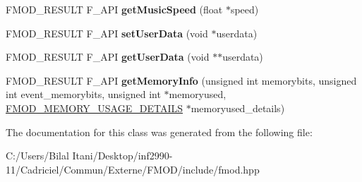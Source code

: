 \begin{DoxyCompactItemize}
\item 
F\+M\+O\+D\+\_\+\+R\+E\+S\+U\+LT F\+\_\+\+A\+PI {\bfseries get\+Music\+Speed} (float $\ast$speed)\hypertarget{class_f_m_o_d_1_1_sound_a22e4865bfd9f4bf40633671439dade82}{}\label{class_f_m_o_d_1_1_sound_a22e4865bfd9f4bf40633671439dade82}

\item 
F\+M\+O\+D\+\_\+\+R\+E\+S\+U\+LT F\+\_\+\+A\+PI {\bfseries set\+User\+Data} (void $\ast$userdata)\hypertarget{class_f_m_o_d_1_1_sound_ac921f8c260ef5b396a837016d5882713}{}\label{class_f_m_o_d_1_1_sound_ac921f8c260ef5b396a837016d5882713}

\item 
F\+M\+O\+D\+\_\+\+R\+E\+S\+U\+LT F\+\_\+\+A\+PI {\bfseries get\+User\+Data} (void $\ast$$\ast$userdata)\hypertarget{class_f_m_o_d_1_1_sound_a829f8e68b254764374c38e6e23f7f8df}{}\label{class_f_m_o_d_1_1_sound_a829f8e68b254764374c38e6e23f7f8df}

\item 
F\+M\+O\+D\+\_\+\+R\+E\+S\+U\+LT F\+\_\+\+A\+PI {\bfseries get\+Memory\+Info} (unsigned int memorybits, unsigned int event\+\_\+memorybits, unsigned int $\ast$memoryused, \hyperlink{struct_f_m_o_d___m_e_m_o_r_y___u_s_a_g_e___d_e_t_a_i_l_s}{F\+M\+O\+D\+\_\+\+M\+E\+M\+O\+R\+Y\+\_\+\+U\+S\+A\+G\+E\+\_\+\+D\+E\+T\+A\+I\+LS} $\ast$memoryused\+\_\+details)\hypertarget{class_f_m_o_d_1_1_sound_abf8d14ac330b572417f9f949456848d5}{}\label{class_f_m_o_d_1_1_sound_abf8d14ac330b572417f9f949456848d5}

\end{DoxyCompactItemize}


The documentation for this class was generated from the following file\+:\begin{DoxyCompactItemize}
\item 
C\+:/\+Users/\+Bilal Itani/\+Desktop/inf2990-\/11/\+Cadriciel/\+Commun/\+Externe/\+F\+M\+O\+D/include/fmod.\+hpp\end{DoxyCompactItemize}
